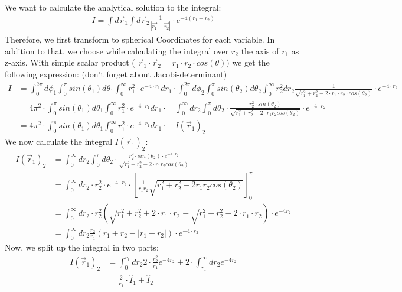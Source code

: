 \documentclass[10pt,a4paper]{article}
\begin{document}
We want to calculate the analytical solution to the integral:
\begin{align*}
I = \int d\vec{r}_1 \int d\vec{r}_2 \frac{1}{|\vec{r_1}-\vec{r_2}|} \cdot e^{-4(r_1+r_2)}
\end{align*}
Therefore, we first transform to spherical Coordinates for each variable. In addition to that, we choose while calculating the integral over $r_2$ the axis of $r_1$ as z-axis. With simple scalar product ( $\vec{r}_1 \cdot \vec{r}_2= r_1 \cdot r_2 \cdot cos( \theta)$) we get the following expression: (don't forget about Jacobi-determinant)
\begin{align}
I&=\int_{0}^{2 \pi} d\phi_1 \int_{0}^{ \pi} sin(\theta_1) d\theta_1 \int_{0}^{\infty}  r_1^2 \cdot e^{-4 \cdot r_1} dr_1\cdot \int_{0}^{2 \pi} d\phi_2 \int_{0}^{ \pi} sin(\theta_2) d\theta_2 \int_{0}^{\infty}  r_2^2 dr_2 \frac{1}{\sqrt{r_1^2+r_2^2-2 \cdot r_1 \cdot r_2\cdot cos(\theta_2)}} \cdot e^{-4 \cdot r_2}\\
&= 4 \pi^2 \cdot \int_{0}^{ \pi} sin(\theta_1) d\theta_1 \int_{0}^{\infty}  r_1^2 \cdot e^{-4 \cdot r_1} dr_1 \cdot \quad \int_{0}^{\infty} dr_2 \int_{0}^{\pi} d\theta_2 \cdot \frac{r_2^2 \cdot sin(\theta_2)}{\sqrt{r_1^2+r_2^2-2 \cdot r_1 r_2 cos(\theta_2)}}\cdot e^{-4 \cdot r_2}\\
&= 4 \pi^2 \cdot \int_{0}^{ \pi} sin(\theta_1) d\theta_1 \int_{0}^{\infty}  r_1^2 \cdot e^{-4 \cdot r_1} dr_1 \cdot \quad I(\vec{r}_1)_2
\end{align}
We now calculate the integral $I(\vec{r}_1)_2$:
\begin{align}
I(\vec{r}_1)_2&= \int_{0}^{\infty} dr_2 \int_{0}^{\pi} d\theta_2 \cdot \frac{r_2^2 \cdot sin(\theta_2)\cdot e^{-4 \cdot r_2}}{\sqrt{r_1^2+r_2^2-2 \cdot r_1 r_2 cos(\theta_2)}}\\
&= \int_{0}^{\infty} dr_2 \cdot r_2^2\cdot e^{-4 \cdot r_2} \cdot \left[ \frac{1}{r_1 r_2} \sqrt{r_1^2+r_2^2 - 2 r_1 r_2 cos(\theta_2)} \right]_0^{\pi}\\
&= \int_{0}^{\infty} dr_2 \cdot r_2^2 \left( \sqrt{r_1^2+r_2^2+2 \cdot r_1 \cdot r_2} -\sqrt{r_1^2+r_2^2-2 \cdot r_1 \cdot r_2}\right) \cdot e^{-4r_2}\\ 
&= \int_{0}^{\infty} dr_2 \frac{r_2}{r_1} \left( r_1+r_2 - |r_1-r_2| \right) \cdot e^{-4 \cdot r_2}
\end{align}
Now, we split up the integral in two parts:
\begin{align}
I(\vec{r}_1)_2&=\int_{0}^{r_1} dr_2 2 \cdot \frac{r_2^2}{r_1} e^{-4 r_2} + 2 \cdot\int_{r_1}^{\infty} dr_2 e^{-4r_2}\\
&= \frac{2}{r_1} \cdot \hat{I}_1 +  \hat{I}_2
\end{align}
\end{document}
